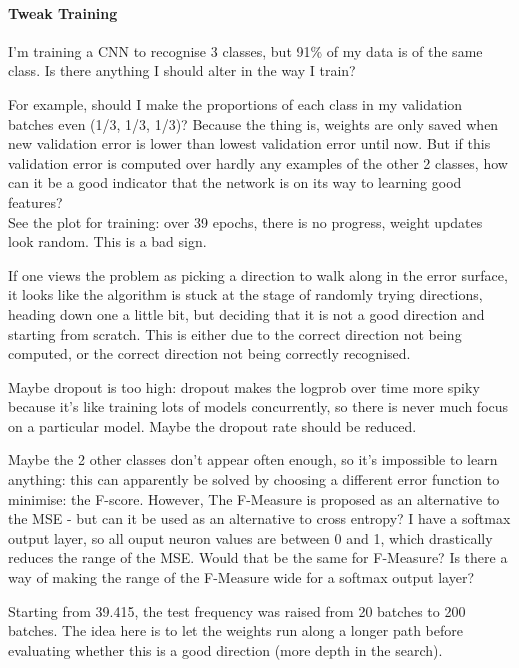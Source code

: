 \documentclass[a4paper,11pt]{article}
\begin{document}
\paragraph{Tweak Training}

I'm training a CNN to recognise 3 classes, but 91\% of my data is of the same class. Is there anything I should alter in the way I train?

For example, should I make the proportions of each class in my validation batches even (1/3, 1/3, 1/3)? Because the thing is, weights are only saved when new validation error is lower than lowest validation error until now. But if this validation error is computed over hardly any examples of the other 2 classes, how can it be a good indicator that the network is on its way to learning good features?﻿\\

See the plot for training: over 39 epochs, there is no progress, weight updates look random. This is a bad sign.

If one views the problem as picking a direction to walk along in the error surface, it looks like the algorithm is stuck at the stage of randomly trying directions, heading down one a little bit, but deciding that it is not a good direction and starting from scratch. This is either due to the correct direction not being computed, or the correct direction not being correctly recognised.

Maybe dropout is too high: dropout makes the logprob over time more spiky because it's like training lots of models concurrently, so there is never much focus on a particular model. Maybe the dropout rate should be reduced.

Maybe the 2 other classes don't appear often enough, so it's impossible to learn anything: this can apparently be solved by choosing a different error function to minimise: the F-score\cite{f-measure}. However, The F-Measure is proposed as an alternative to the MSE - but can it be used as an alternative to cross entropy? I have a softmax output layer, so all ouput neuron values are between 0 and 1, which drastically reduces the range of the MSE. Would that be the same for F-Measure? Is there a way of making the range of the F-Measure wide for a softmax output layer? 

Starting from 39.415, the test frequency was raised from 20 batches to 200 batches. The idea here is to let the weights run along a longer path before evaluating whether this is a good direction (more depth in the search).
\end{document}
